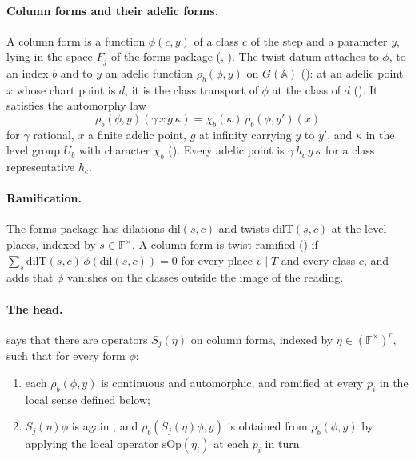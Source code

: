 \documentclass[11pt]{article}
\newcommand{\Fq}{\mathbb F}
\newcommand{\rT}{\rho}
\theoremstyle{definition}
\theoremstyle{remark}
\begin{document}
\paragraph{Column forms and their adelic forms.} A column form is a function $\phi(c,y)$ of a class $c$ of the step and a parameter $y$, lying in the space $F_j$ of the forms package (, ). The twist datum attaches to $\phi$, to an index $b$ and to $y$ an adelic function $\rT_b(\phi,y)$ on $G(\mathbb A)$ (): at an adelic point $x$ whose chart point is $d$, it is the class transport of $\phi$ at the class of $d$ (). It satisfies the automorphy law
\begin{equation}\label{eq:law}
\rT_b(\phi,y)(\gamma\,x\,g\,\kappa)=\chi_b(\kappa)\,\rT_b(\phi,y')(x)
\end{equation}
for $\gamma$ rational, $x$ a finite adelic point, $g$ at infinity carrying $y$ to $y'$, and $\kappa$ in the level group $U_b$ with character $\chi_b$ (). Every adelic point is $\gamma\,h_c\,g\,\kappa$ for a class representative $h_c$.

\paragraph{Ramification.} The forms package has dilations $\mathrm{dil}(s,c)$ and twists $\mathrm{dilT}(s,c)$ at the level places, indexed by $s\in\Fq^\times$. A column form is twist-ramified () if $\sum_{s}\mathrm{dilT}(s,c)\,\phi(\mathrm{dil}(s,c))=0$ for every place $v\mid T$ and every class $c$, and  adds that $\phi$ vanishes on the classes outside the image of the reading.

\paragraph{The head.}  says that there are operators $S_j(\eta)$ on column forms, indexed by $\eta\in(\Fq^\times)^r$, such that for every  form $\phi$:
\begin{enumerate}[label=(\roman*),itemsep=1pt]
\item each $\rT_b(\phi,y)$ is continuous and automorphic, and ramified at every $p_i$ in the local sense defined below;
\item $S_j(\eta)\phi$ is again , and $\rT_b(S_j(\eta)\phi,y)$ is obtained from $\rT_b(\phi,y)$ by applying the local operator $\mathrm{sOp}(\eta_i)$ at each $p_i$ in turn.
\end{enumerate}
\end{document}
